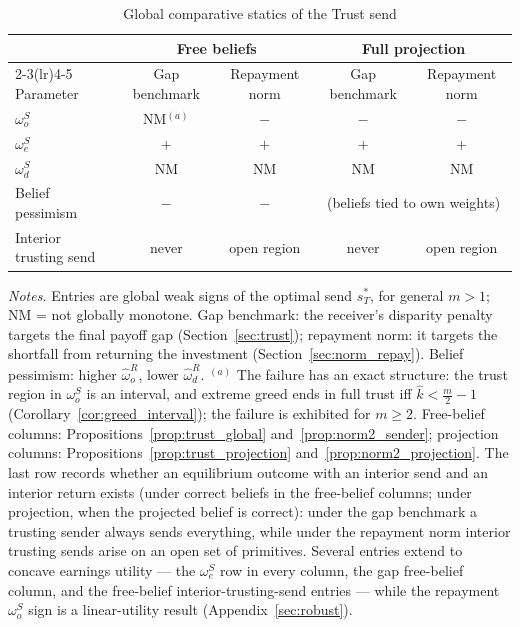 \documentclass[11pt]{article}
\theoremstyle{plain}
\theoremstyle{remark}
\begin{document}
\begin{table}[ht]
\centering
\small
\renewcommand{\arraystretch}{1.25}
\caption{Global comparative statics of the Trust send}
\label{tab:trust_global_m3}
\begin{tabular}{l cc cc}
\toprule
& \multicolumn{2}{c}{Free beliefs} & \multicolumn{2}{c}{Full projection} \\
\cmidrule(lr){2-3}\cmidrule(lr){4-5}
Parameter & Gap benchmark & Repayment norm & Gap benchmark & Repayment norm \\
\midrule
$\omega_o^S$ & NM$^{(a)}$ & $-$ & $-$ & $-$ \\
$\omega_e^S$ & $+$ & $+$ & $+$ & $+$ \\
$\omega_d^S$ & NM & NM & NM & NM \\
Belief pessimism & $-$ & $-$ & \multicolumn{2}{c}{(beliefs tied to own weights)} \\
Interior trusting send & never & open region & never & open region \\
\bottomrule
\end{tabular}

\vspace{4pt}
\parbox{0.94\textwidth}{\footnotesize
\emph{Notes.}  Entries are global weak signs of the optimal send $s_T^\ast$, for general $m>1$; NM = not globally monotone.  Gap benchmark: the receiver's disparity penalty targets the final payoff gap (Section~\ref{sec:trust}); repayment norm: it targets the shortfall from returning the investment (Section~\ref{sec:norm_repay}).  Belief pessimism: higher $\hat\omega_o^{R}$, lower $\hat\omega_d^{R}$.  $^{(a)}$ The failure has an exact structure: the trust region in $\omega_o^S$ is an interval, and extreme greed ends in full trust iff $\hat k<\tfrac m2-1$ (Corollary~\ref{cor:greed_interval}); the failure is exhibited for $m\ge2$.  Free-belief columns: Propositions~\ref{prop:trust_global} and~\ref{prop:norm2_sender}; projection columns: Propositions~\ref{prop:trust_projection} and~\ref{prop:norm2_projection}.  The last row records whether an equilibrium outcome with an interior send and an interior return exists (under correct beliefs in the free-belief columns; under projection, when the projected belief is correct): under the gap benchmark a trusting sender always sends everything, while under the repayment norm interior trusting sends arise on an open set of primitives.  Several entries extend to concave earnings utility --- the $\omega_e^S$ row in every column, the gap free-belief column, and the free-belief interior-trusting-send entries --- while the repayment $\omega_o^S$ sign is a linear-utility result (Appendix~\ref{sec:robust}).}
\end{table}
\end{document}
